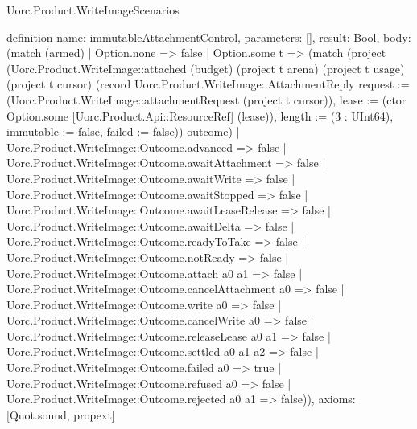\begin{lexlean}{Uorc.Product.WriteImageScenarios}
\begin{semanticmodule}
definition{
  name: immutableAttachmentControl,
  parameters: [],
  result: Bool,
  body: (match (armed)
    | Option.none => false
    | Option.some t => (match (project (Uorc.Product.WriteImage::attached (budget) (project t arena) (project t usage) (project t cursor) (record Uorc.Product.WriteImage::AttachmentReply {request := (Uorc.Product.WriteImage::attachmentRequest (project t cursor)), lease := (ctor Option.some [Uorc.Product.Api::ResourceRef] (lease)), length := (3 : UInt64), immutable := false, failed := false})) outcome)
      | Uorc.Product.WriteImage::Outcome.advanced => false
      | Uorc.Product.WriteImage::Outcome.awaitAttachment => false
      | Uorc.Product.WriteImage::Outcome.awaitWrite => false
      | Uorc.Product.WriteImage::Outcome.awaitStopped => false
      | Uorc.Product.WriteImage::Outcome.awaitLeaseRelease => false
      | Uorc.Product.WriteImage::Outcome.awaitDelta => false
      | Uorc.Product.WriteImage::Outcome.readyToTake => false
      | Uorc.Product.WriteImage::Outcome.notReady => false
      | Uorc.Product.WriteImage::Outcome.attach a0 a1 => false
      | Uorc.Product.WriteImage::Outcome.cancelAttachment a0 => false
      | Uorc.Product.WriteImage::Outcome.write a0 => false
      | Uorc.Product.WriteImage::Outcome.cancelWrite a0 => false
      | Uorc.Product.WriteImage::Outcome.releaseLease a0 a1 => false
      | Uorc.Product.WriteImage::Outcome.settled a0 a1 a2 => false
      | Uorc.Product.WriteImage::Outcome.failed a0 => true
      | Uorc.Product.WriteImage::Outcome.refused a0 => false
      | Uorc.Product.WriteImage::Outcome.rejected a0 a1 => false)),
  axioms: [Quot.sound, propext]
}


\end{semanticmodule}
\end{lexlean}
